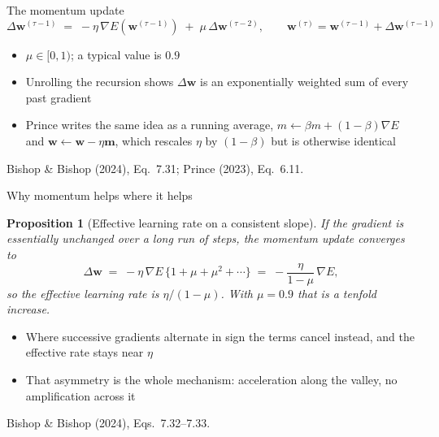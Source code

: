 \documentclass[aspectratio=169, 11pt]{beamer}
\newtheorem{propx}[theorem]{Proposition}
\newcommand{\srcline}[1]{%
  \par\vspace{0.25em}%
  {\scriptsize\color{mcMuted}\hfill #1\par}}
\begin{document}
\begin{frame}{The momentum update}
  \vspace{-0.3em}
  \[
    \Delta \mathbf{w}^{(\tau-1)}
      \;=\; -\eta\,\nabla E\!\left(\mathbf{w}^{(\tau-1)}\right)
            \;+\; \mu\,\Delta \mathbf{w}^{(\tau-2)},
    \qquad
    \mathbf{w}^{(\tau)} = \mathbf{w}^{(\tau-1)} + \Delta \mathbf{w}^{(\tau-1)}
  \]
  \vspace{-0.7em}
  \begin{itemize}\itemsep0.35em
    \item $\mu \in [0, 1)$; a typical value is $0.9$
    \item Unrolling the recursion shows $\Delta \mathbf{w}$ is an exponentially
          weighted sum of \alert{every} past gradient
    \item Prince writes the same idea as a running average,
          $m \leftarrow \beta m + (1-\beta)\nabla E$ and
          $\mathbf{w} \leftarrow \mathbf{w} - \eta \mathbf{m}$, which rescales $\eta$ by
          $(1-\beta)$ but is otherwise identical
  \end{itemize}
  \srcline{Bishop \& Bishop (2024), Eq.~7.31; Prince (2023), Eq.~6.11.}
\end{frame}

\begin{frame}{Why momentum helps where it helps}
  \vspace{-0.25em}
  \begin{propx}[Effective learning rate on a consistent slope]\label{th:mom}
    \small
    If the gradient is essentially unchanged over a long run of steps,
    the momentum update converges to
    \[
      \Delta \mathbf{w} \;=\; -\eta\,\nabla E\,\{1 + \mu + \mu^2 + \cdots\}
                \;=\; -\frac{\eta}{1-\mu}\,\nabla E ,
    \]
    so the effective learning rate is $\eta/(1-\mu)$. With $\mu = 0.9$
    that is a tenfold increase.
  \end{propx}
  \vspace{0.3em}
  \begin{itemize}\itemsep0.35em
    \item Where successive gradients \alert{alternate} in sign the terms
          cancel instead, and the effective rate stays near $\eta$
    \item That asymmetry is the whole mechanism: acceleration along the
          valley, no amplification across it
  \end{itemize}
  \srcline{Bishop \& Bishop (2024), Eqs.~7.32--7.33.}
\end{frame}
\end{document}
